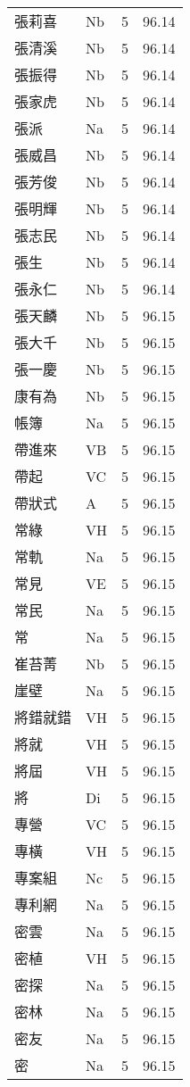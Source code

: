 \documentclass[twocolumn]{book}
\begin{document}
\begin{supertabular}{llrr}
張莉喜 & Nb & 5 &  96.14\\
張清溪 & Nb & 5 &  96.14\\
張振得 & Nb & 5 &  96.14\\
張家虎 & Nb & 5 &  96.14\\
張派 & Na & 5 &  96.14\\
張威昌 & Nb & 5 &  96.14\\
張芳俊 & Nb & 5 &  96.14\\
張明輝 & Nb & 5 &  96.14\\
張志民 & Nb & 5 &  96.14\\
張生 & Nb & 5 &  96.14\\
張永仁 & Nb & 5 &  96.14\\
張天麟 & Nb & 5 &  96.15\\
張大千 & Nb & 5 &  96.15\\
張一慶 & Nb & 5 &  96.15\\
康有為 & Nb & 5 &  96.15\\
帳簿 & Na & 5 &  96.15\\
帶進來 & VB & 5 &  96.15\\
帶起 & VC & 5 &  96.15\\
帶狀式 & A & 5 &  96.15\\
常綠 & VH & 5 &  96.15\\
常軌 & Na & 5 &  96.15\\
常見 & VE & 5 &  96.15\\
常民 & Na & 5 &  96.15\\
常 & Na & 5 &  96.15\\
崔苔菁 & Nb & 5 &  96.15\\
崖壁 & Na & 5 &  96.15\\
將錯就錯 & VH & 5 &  96.15\\
將就 & VH & 5 &  96.15\\
將屆 & VH & 5 &  96.15\\
將 & Di & 5 &  96.15\\
專營 & VC & 5 &  96.15\\
專橫 & VH & 5 &  96.15\\
專案組 & Nc & 5 &  96.15\\
專利網 & Na & 5 &  96.15\\
密雲 & Na & 5 &  96.15\\
密植 & VH & 5 &  96.15\\
密探 & Na & 5 &  96.15\\
密林 & Na & 5 &  96.15\\
密友 & Na & 5 &  96.15\\
密 & Na & 5 &  96.15\\

\end{supertabular}
\end{document}
